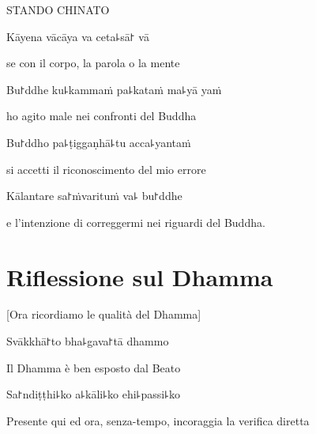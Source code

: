 \begin{instruction}
  STANDO CHINATO
\end{instruction}

Kāyena vācāya va ceta꜕sā꜓ vā\\
\begin{english}
se con il corpo, la parola o la mente \\
\end{english}

Bu꜓ddhe ku꜕kammaṁ pa꜕kataṁ ma꜕yā yaṁ\\
\begin{english}
ho agito male nei confronti del Buddha\\
\end{english}

Bu꜓ddho pa꜕ṭiggaṇhā꜕tu acca꜕yantaṁ\\

\begin{english}
si accetti il riconoscimento del mio errore \\
\end{english}

Kālantare sa꜓ṁvarituṁ va꜕ bu꜓ddhe

\begin{english}
  e l'intenzione di correggermi nei riguardi del Buddha.
\end{english}

\clearpage


\chapter*{Riflessione sul Dhamma}

\delegateSetUseNext

\begin{leader}
\end{leader}

\begin{english}
[Ora ricordiamo le qualità del Dhamma]
\end{english}

Svākkhā꜓to bha꜕gava꜓tā dhammo\\
\begin{english}
Il Dhamma è ben esposto dal Beato\\
\end{english}

Sa꜓ndiṭṭhi꜕ko a꜕kāli꜕ko ehi꜕passi꜕ko\\
\begin{english}
Presente qui ed ora, senza-tempo, incoraggia la verifica diretta\\
\end{english}


